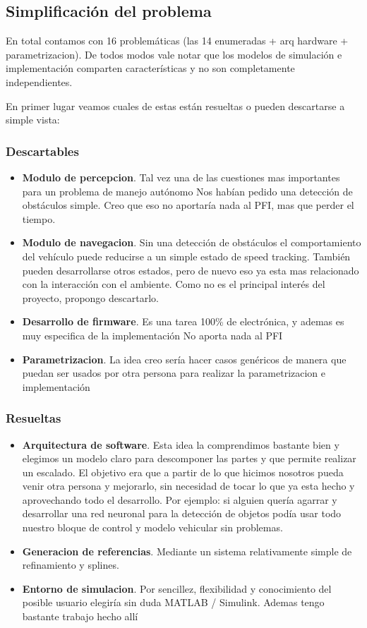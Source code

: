 \documentclass[12pt,a4paper,fleqn]{report}
\begin{document}
\subsection*{Simplificación del problema}
En total contamos con 16 problemáticas (las 14 enumeradas + arq hardware + parametrizacion). De todos modos vale notar que los modelos de simulación e implementación comparten características y no son completamente independientes.

En primer lugar veamos cuales de estas están resueltas o pueden descartarse a simple vista:
\subsubsection*{Descartables}
\begin{itemize}
	\item \textbf{Modulo de percepcion}. Tal vez una de las cuestiones mas importantes para un problema de manejo autónomo Nos habían pedido una detección de obstáculos simple. Creo que eso no aportaría nada al PFI, mas que perder el tiempo.
	\item \textbf{Modulo de navegacion}. Sin una detección de obstáculos el comportamiento del vehículo puede reducirse a un simple estado de speed tracking. También pueden desarrollarse otros estados, pero de nuevo eso ya esta mas relacionado con la interacción con el ambiente. Como no es el principal interés del proyecto, propongo descartarlo.
	\item \textbf{Desarrollo de firmware}. Es una tarea 100\% de electrónica, y ademas es muy especifica de la implementación No aporta nada al PFI
	\item \textbf{Parametrizacion}. La idea creo sería hacer casos genéricos de manera que puedan ser usados por otra persona para realizar la parametrizacion e implementación
\end{itemize}

\subsubsection*{Resueltas}
\begin{itemize}
	\item \textbf{Arquitectura de software}. Esta idea la comprendimos bastante bien y elegimos un modelo claro para descomponer las partes y que permite realizar un escalado. El objetivo era que a partir de lo que hicimos nosotros pueda venir otra persona y mejorarlo, sin necesidad de tocar lo que ya esta hecho y aprovechando todo el desarrollo. Por ejemplo: si alguien quería agarrar y desarrollar una red neuronal para la detección de objetos podía usar todo nuestro bloque de control y modelo vehicular sin problemas.
	\item \textbf{Generacion de referencias}. Mediante un sistema relativamente simple de refinamiento y splines.
	\item \textbf{Entorno de simulacion}. Por sencillez, flexibilidad  y conocimiento del posible usuario elegiría sin duda MATLAB / Simulink. Ademas tengo bastante trabajo hecho allí
\end{itemize}
\end{document}
